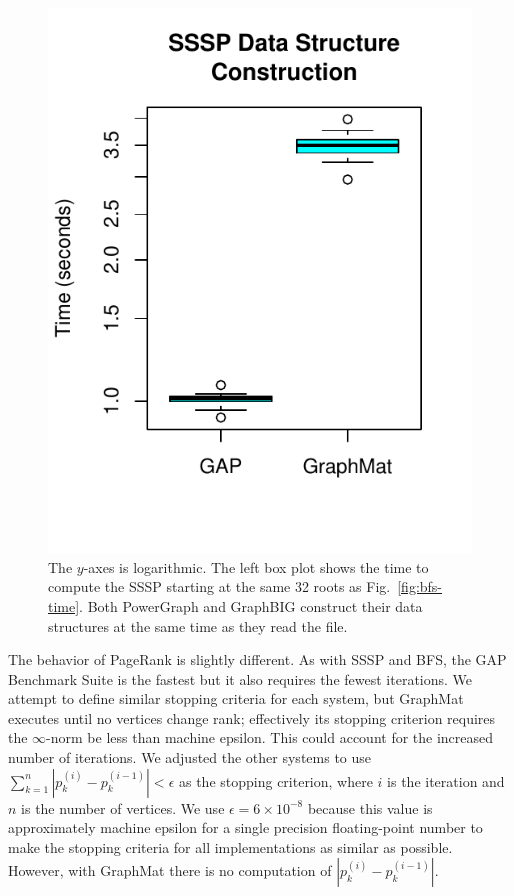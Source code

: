 \documentclass[conference]{IEEEtran}
\begin{document}
\begin{figure}
\begin{minipage}{0.365\linewidth}
		\includegraphics[width=\linewidth, trim=0 36pt 18pt 0, clip]{graphics/sssp_dsc.pdf}
	\end{minipage}
	\caption{The $y$-axes is logarithmic. The left box plot shows the time to compute the SSSP starting at the same 32 roots as Fig.~\ref{fig:bfs-time}. Both PowerGraph and GraphBIG construct their data structures at the same time as they read the file.}
	\label{fig:sssp-time}
\end{figure}

The behavior of PageRank is slightly different. As with SSSP and BFS, the GAP Benchmark Suite is the fastest but it also requires the fewest iterations. We attempt to define similar stopping criteria for each system, but GraphMat executes until no vertices change rank; effectively its stopping criterion requires the $\infty$-norm be less than machine epsilon. This could account for the increased number of iterations. We adjusted the other systems to use $\sum_{k=1}^{n} |p_k^{(i)} - p_k^{(i-1)}| < \epsilon $ as the stopping criterion, where $i$ is the iteration and $n$ is the number of vertices. We use $\epsilon = 6 \times 10^{-8}$ because this value is approximately machine epsilon for a single precision floating-point number to make the stopping criteria for all implementations as similar as possible. However, with GraphMat there is no computation of $|p_k^{(i)} - p_k^{(i-1)}|$.
\end{document}
